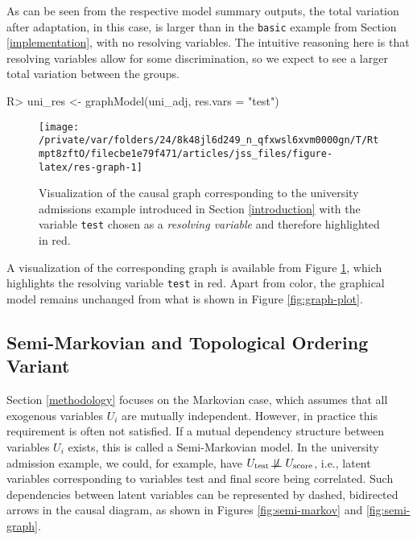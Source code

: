 \documentclass[
  nojss]{jss}
\begin{document}
As can be seen from the respective model summary outputs, the total
variation after adaptation, in this case, is larger than in the
\texttt{basic} example from Section \ref{implementation}, with no
resolving variables. The intuitive reasoning here is that resolving
variables allow for some discrimination, so we expect to see a larger
total variation between the groups.

\begin{CodeChunk}
\begin{CodeInput}
R> uni_res <- graphModel(uni_adj, res.vars = "test")
\end{CodeInput}
\end{CodeChunk}

\begin{CodeChunk}
\begin{figure}

{\centering \texttt{[image: /private/var/folders/24/8k48jl6d249\_n\_qfxwsl6xvm0000gn/T/Rtmpt8zftO/filecbe1e79f471/articles/jss\_files/figure-latex/res-graph-1]} 

}

\caption[Visualization of the causal graph corresponding to the university admissions example introduced in Section \ref{introduction} with the variable \texttt{test} chosen as a \textit{resolving variable} and therefore highlighted in red]{Visualization of the causal graph corresponding to the university admissions example introduced in Section \ref{introduction} with the variable \texttt{test} chosen as a \textit{resolving variable} and therefore highlighted in red.}\label{fig:res-graph}
\end{figure}
\end{CodeChunk}

A visualization of the corresponding graph is available from Figure
\ref{fig:res-graph}, which highlights the resolving variable
\texttt{test} in red. Apart from color, the graphical model remains
unchanged from what is shown in Figure \ref{fig:graph-plot}.

\hypertarget{semi-markovian-and-topological-ordering-variant}{%
\subsection{Semi-Markovian and Topological Ordering
Variant}\label{semi-markovian-and-topological-ordering-variant}}

Section \ref{methodology} focuses on the Markovian case, which assumes
that all exogenous variables \(U_i\) are mutually independent. However,
in practice this requirement is often not satisfied. If a mutual
dependency structure between variables \(U_i\) exists, this is called a
Semi-Markovian model. In the university admission example, we could, for
example, have
\(U_{\text{test}} \not\!\perp\!\!\!\perp U_{\text{score}}\), i.e.,
latent variables corresponding to variables test and final score being
correlated. Such dependencies between latent variables can be
represented by dashed, bidirected arrows in the causal diagram, as shown
in Figures \ref{fig:semi-markov} and \ref{fig:semi-graph}.
\end{document}
